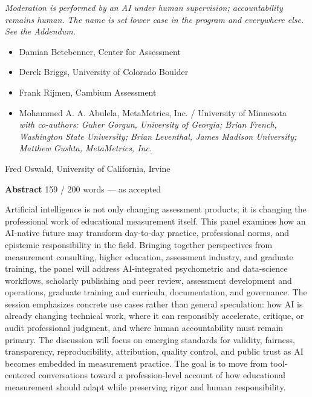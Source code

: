 \documentclass[11pt]{article}
\newcommand{\fieldlabel}[2][]{%
  \par\addvspace{1.25em}\Needspace{8\baselineskip}%
  \noindent\begin{minipage}{\linewidth}%
    {\NotoHeading\bfseries\large\color{ContentPrimary}#2}%
    \hfill{\normalfont\footnotesize\color{ContentSecondary}#1}%
  \end{minipage}\par
  \vspace{0.2em}{\color{BorderModerate}\rule{\linewidth}{0.4pt}}\par
  \vspace{0.55em}%
}
\begin{document}
\vspace{0.15em}
{\itshape\color{ContentSecondary}Moderation is performed by an AI under human supervision; accountability
remains human. The name is set lower case in the program and everywhere else.
See the Addendum.}\par

\vspace{0.4em}
\begin{itemize}
  \item Damian Betebenner, Center for Assessment
  \item Derek Briggs, University of Colorado Boulder
  \item Frank Rijmen, Cambium Assessment
  \item Mohammed A. A. Abulela, MetaMetrics, Inc. / University of Minnesota\\
        {\itshape\color{ContentSecondary}with co-authors: Guher Gorgun, University of Georgia; Brian French, Washington State University; Brian Leventhal, James Madison University; Matthew Gushta, MetaMetrics, Inc.}
\end{itemize}

\vspace{0.15em}
%
Fred Oswald, University of California, Irvine

\fieldlabel[159 / 200 words --- as accepted]{Abstract}

Artificial intelligence is not only changing assessment products; it is changing
the professional work of educational measurement itself. This panel examines how
an AI-native future may transform day-to-day practice, professional norms, and
epistemic responsibility in the field. Bringing together perspectives from
measurement consulting, higher education, assessment industry, and graduate
training, the panel will address AI-integrated
psychometric and data-science workflows, scholarly publishing and peer review,
assessment development and operations, graduate training and curricula,
documentation, and governance. The session emphasizes concrete use cases rather than general
speculation: how AI is already changing technical work, where it can responsibly
accelerate, critique, or audit professional judgment, and where human
accountability must remain primary. The discussion will focus on emerging
standards for validity, fairness, transparency, reproducibility, attribution,
quality control, and public trust as AI becomes embedded in measurement
practice. The goal is to move from tool-centered conversations toward a
profession-level account of how educational measurement should adapt while
preserving rigor and human responsibility.
\end{document}

